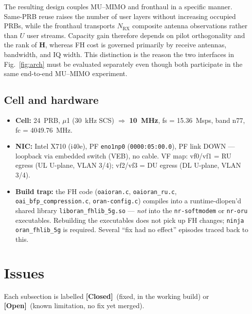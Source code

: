 \documentclass[11pt,a4paper]{article}
\newcommand{\closed}{\textcolor{closedcol}{\textbf{[Closed]}}}
\newcommand{\openissue}{\textcolor{opencol}{\textbf{[Open]}}}
\begin{document}
The resulting design couples MU--MIMO and fronthaul in a specific manner.  Same-PRB reuse raises
the number of user layers without increasing occupied PRBs, while the fronthaul transports
$N_{\mathrm{RX}}$ composite antenna observations rather than $U$ user streams.  Capacity gain
therefore depends on pilot orthogonality and the rank of $\mathbf{H}$, whereas FH cost is governed
primarily by receive antennas, bandwidth, and IQ width.  This distinction is the reason the two
interfaces in Fig.~\ref{fig:arch} must be evaluated separately even though both participate in
the same end-to-end MU--MIMO experiment.

\subsection{Cell and hardware}

\begin{itemize}[leftmargin=1.4em]
\item \textbf{Cell:} 24~PRB, $\mu$1 (30~kHz SCS) $\Rightarrow$ \textbf{10~MHz}, fs = 15.36~Msps,
  band n77, fc = 4049.76~MHz.
\item \textbf{NIC:} Intel X710 (i40e), PF \texttt{eno1np0} (\texttt{0000:05:00.0}), PF link
  DOWN --- loopback via embedded switch (VEB), no cable.
  VF map: vf0/vf1 = RU egress (UL U-plane, VLAN 3/4);
  vf2/vf3 = DU egress (DL U-plane, VLAN 3/4).
\item \textbf{Build trap:} the FH code (\texttt{oaioran.c}, \texttt{oaioran_ru.c},
  \texttt{oai_bfp_compression.c}, \texttt{oran-config.c}) compiles into a
  runtime-dlopen'd shared library \texttt{liboran_fhlib_5g.so} --- \emph{not} into the
  \texttt{nr-softmodem} or \texttt{nr-oru} executables. Rebuilding the executables does not
  pick up FH changes; \texttt{ninja oran_fhlib_5g} is required. Several ``fix had no effect''
  episodes traced back to this.
\end{itemize}

\section{Issues}

Each subsection is labelled \closed\ (fixed, in the working build) or
\openissue\ (known limitation, no fix yet merged).

\end{document}
